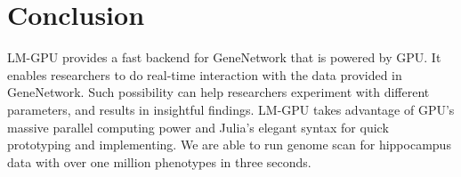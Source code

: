 \documentclass[9pt,twocolumn,twoside,lineno]{gsag3jnl}
\begin{document}
\section{Conclusion}

LM-GPU provides a fast backend for GeneNetwork that is powered by GPU. 
It enables researchers to do real-time interaction with the data provided in GeneNetwork. 
Such possibility can help researchers experiment with different parameters, and results in insightful findings. 
LM-GPU takes advantage of GPU's massive parallel computing power and Julia's elegant syntax for quick prototyping and implementing. 
We are able to run genome scan for hippocampus data with over one million phenotypes in three seconds. 




\end{document}
